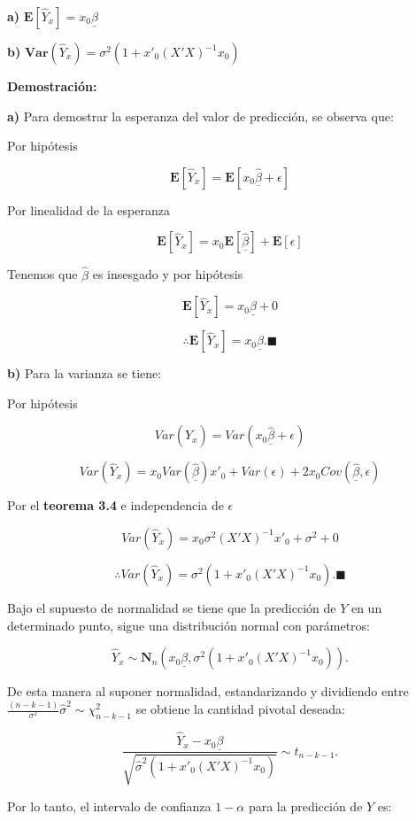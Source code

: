 \documentclass[
  a4paper,
  oneside,
  openany]{book}
\begin{document}
\textbf{a)} \(\mathbf{E}[\hat{Y}_{x}]=x_{0}\underline{\beta}\)

\textbf{b)} \(\textbf{Var}(\hat{Y}_{x})=\sigma^2\left(1+x'_{0}(X'X)^{-1}x_{0}\right)\)

\textbf{Demostración:}

\textbf{a)} Para demostrar la esperanza del valor de predicción, se observa que:

Por hipótesis

\[\mathbf{E}[\hat{Y}_{x}]=\mathbf{E}[x_{0}\underline{\hat{\beta}}+\epsilon]\]

Por linealidad de la esperanza

\[\mathbf{E}[\hat{Y}_{x}]=x_{0}\mathbf{E}[\underline{\hat{\beta}}]+\mathbf{E}[\epsilon]\]

Tenemos que \(\hat{\beta}\) es insesgado y por hipótesis

\[\mathbf{E}[\hat{Y}_{x}]=x_{0}\underline{\beta}+0\]

\[\therefore \mathbf{E}[\hat{Y}_{x}]=x_{0}\underline{\beta}. \blacksquare\]

\textbf{b)} Para la varianza se tiene:

Por hipótesis

\[Var(\hat{Y}_{x})=Var(x_{0}\underline{\hat{\beta}}+\epsilon)\]

\[Var(\hat{Y}_{x})=x_{0}Var(\underline{\hat{\beta}})x'_{0}+Var(\epsilon)+2x_{0}Cov(\underline{\hat{\beta}},\epsilon)\]

Por el \textbf{teorema 3.4} e independencia de \(\epsilon\)

\[Var(\hat{Y}_{x})=x_{0}\sigma^2(X'X)^{-1}x'_{0}+\sigma^2+0\]

\[\therefore Var(\hat{Y}_{x})=\sigma^2\left(1+x'_{0}(X'X)^{-1}x_{0}\right). \blacksquare\]

Bajo el supuesto de normalidad se tiene que la predicción de \(Y\) en un determinado punto, sigue una distribución normal con parámetros:

\[\hat{Y}_{x} \sim \mathbf{N}_{n} \left( x_{0}\underline{\beta}, \sigma^2\left(1+x'_{0}(X'X)^{-1}x_{0}\right)\right).\]

De esta manera al suponer normalidad, estandarizando y dividiendo entre \(\frac{(n-k-1)}{\sigma^2}\hat{\sigma}^2 \sim \chi^2_{n-k-1}\) se obtiene la cantidad pivotal deseada:

\[\frac{\hat{Y}_{x}-x_{0}\underline{\beta}}{\sqrt{\hat{\sigma}^2\left(1+x'_{0}(X'X)^{-1}x_{0}\right)}} \sim t_{n-k-1}.\]

Por lo tanto, el intervalo de confianza \(1-\alpha\) para la predicción de \(Y\) es:
\end{document}
